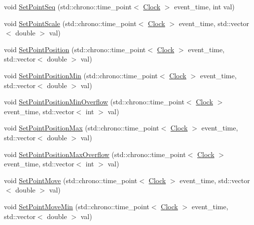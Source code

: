 \begin{DoxyCompactItemize}
\item 
void \hyperlink{class_point_a912aefb007184f73b86c37257a415237}{Set\+Point\+Seq} (std\+::chrono\+::time\+\_\+point$<$ \hyperlink{universe_8h_a0ef8d951d1ca5ab3cfaf7ab4c7a6fd80}{Clock} $>$ event\+\_\+time, int val)
\item 
void \hyperlink{class_point_a8fc02455a773624df80933403b0e545f}{Set\+Point\+Scale} (std\+::chrono\+::time\+\_\+point$<$ \hyperlink{universe_8h_a0ef8d951d1ca5ab3cfaf7ab4c7a6fd80}{Clock} $>$ event\+\_\+time, std\+::vector$<$ double $>$ val)
\item 
void \hyperlink{class_point_a9191f97ece64b8385140d5f800a3a4ca}{Set\+Point\+Position} (std\+::chrono\+::time\+\_\+point$<$ \hyperlink{universe_8h_a0ef8d951d1ca5ab3cfaf7ab4c7a6fd80}{Clock} $>$ event\+\_\+time, std\+::vector$<$ double $>$ val)
\item 
void \hyperlink{class_point_ad47980a6ed515a2def172d757af46f1a}{Set\+Point\+Position\+Min} (std\+::chrono\+::time\+\_\+point$<$ \hyperlink{universe_8h_a0ef8d951d1ca5ab3cfaf7ab4c7a6fd80}{Clock} $>$ event\+\_\+time, std\+::vector$<$ double $>$ val)
\item 
void \hyperlink{class_point_ab0c0a837abb8bd52a59f82723a31f61f}{Set\+Point\+Position\+Min\+Overflow} (std\+::chrono\+::time\+\_\+point$<$ \hyperlink{universe_8h_a0ef8d951d1ca5ab3cfaf7ab4c7a6fd80}{Clock} $>$ event\+\_\+time, std\+::vector$<$ int $>$ val)
\item 
void \hyperlink{class_point_adb2897b1a7bde15e81b72cb59342f186}{Set\+Point\+Position\+Max} (std\+::chrono\+::time\+\_\+point$<$ \hyperlink{universe_8h_a0ef8d951d1ca5ab3cfaf7ab4c7a6fd80}{Clock} $>$ event\+\_\+time, std\+::vector$<$ double $>$ val)
\item 
void \hyperlink{class_point_a29aca71cae82195775f3822740df80ec}{Set\+Point\+Position\+Max\+Overflow} (std\+::chrono\+::time\+\_\+point$<$ \hyperlink{universe_8h_a0ef8d951d1ca5ab3cfaf7ab4c7a6fd80}{Clock} $>$ event\+\_\+time, std\+::vector$<$ int $>$ val)
\item 
void \hyperlink{class_point_a2cf44d5cf17ecf2b3385bde963678589}{Set\+Point\+Move} (std\+::chrono\+::time\+\_\+point$<$ \hyperlink{universe_8h_a0ef8d951d1ca5ab3cfaf7ab4c7a6fd80}{Clock} $>$ event\+\_\+time, std\+::vector$<$ double $>$ val)
\item 
void \hyperlink{class_point_a287698b6f3ec6a610447fded5c3542ca}{Set\+Point\+Move\+Min} (std\+::chrono\+::time\+\_\+point$<$ \hyperlink{universe_8h_a0ef8d951d1ca5ab3cfaf7ab4c7a6fd80}{Clock} $>$ event\+\_\+time, std\+::vector$<$ double $>$ val)
\item 

\end{DoxyCompactItemize}
